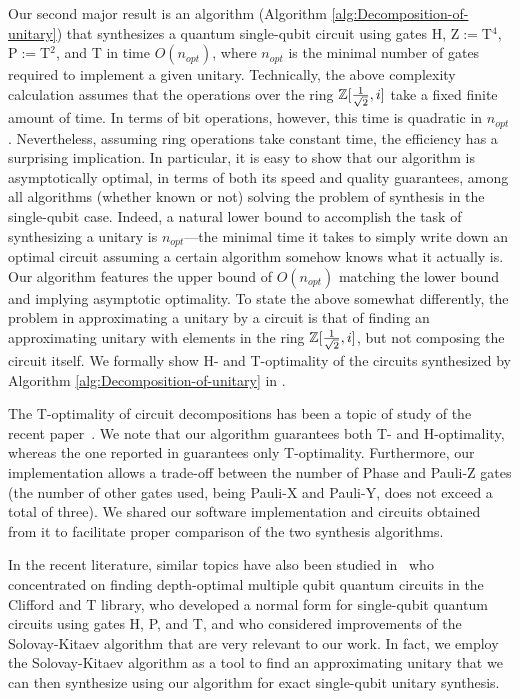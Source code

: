 \documentclass[english,journal]{extarticle}
\theoremstyle{plain}
\theoremstyle{plain}
\theoremstyle{plain}
\theoremstyle{definition}
\theoremstyle{plain}
\theoremstyle{plain}
\begin{document}
Our second major result is an algorithm (Algorithm \ref{alg:Decomposition-of-unitary}) that
synthesizes a quantum single-qubit circuit using gates H, Z$:=$T$^4$,
P$:=$T$^2$, and T in time $O\left(n_{opt}\right)$, where $n_{opt}$ is the
minimal number of gates required to implement a given unitary.  Technically, the
above complexity calculation assumes that the operations over the ring $\mathbb{Z}[\frac{1}{\sqrt{2}},i]$ take
a fixed finite amount of time.  In terms of bit operations, however, this time is 
quadratic in $n_{opt}$.  Nevertheless, assuming ring operations take constant time, the efficiency has a surprising
implication.  In particular, it is easy to show that our algorithm is
asymptotically optimal, in terms of both its speed and quality guarantees, among
all algorithms (whether known or not) solving the problem of synthesis in the
single-qubit case.  Indeed, a natural lower bound to accomplish the task of
synthesizing a unitary is $n_{opt}$---the minimal time it takes to simply write
down an optimal circuit assuming a certain algorithm somehow knows what it
actually is. Our 
algorithm features the upper bound of $O\left(n_{opt}\right)$ matching the lower
bound and implying asymptotic optimality.  To state the above somewhat
differently, the problem in approximating a unitary by a circuit is that of
finding an approximating unitary with elements in the ring $\mathbb{Z}[\frac{1}{\sqrt{2}},i]$, but not composing the 
circuit itself. We formally show H- and T-optimality of the circuits synthesized by Algorithm \ref{alg:Decomposition-of-unitary} in .

The T-optimality of circuit decompositions has been a topic of study of the recent paper~\cite{Sv}. 
We note that our algorithm guarantees both T- and H-optimality, whereas 
the one reported in \cite{Sv} guarantees only T-optimality.  Furthermore, our implementation allows a trade-off between 
the number of Phase and Pauli-Z gates (the number of other gates used, being Pauli-X and Pauli-Y, does not exceed a total of three).  We shared our 
software implementation and circuits obtained from it to facilitate proper comparison of the two synthesis algorithms.

In the recent literature, similar topics have also been studied in~\cite{Amy}
who concentrated on finding depth-optimal multiple qubit quantum circuits in the
Clifford and T library, \cite{MA} who developed a normal form for single-qubit
quantum circuits using gates H, P, and T, and \cite{Dawson2008, F:PhD} who
considered improvements of the Solovay-Kitaev algorithm that are very relevant
to our work.  In fact, we employ the Solovay-Kitaev algorithm as a tool to find an
approximating unitary that we can then synthesize using our algorithm for exact
single-qubit unitary synthesis. 
\end{document}
